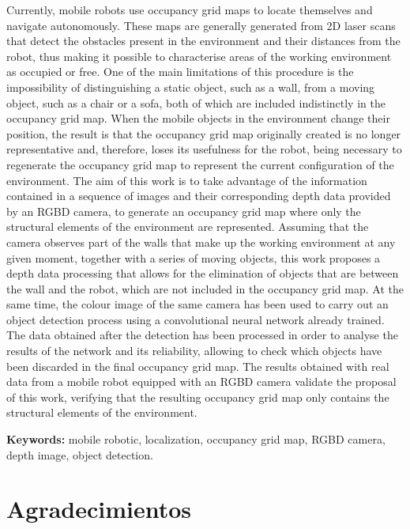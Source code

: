 Currently, mobile robots use occupancy grid maps to locate themselves and navigate autonomously. These maps are generally generated from 2D laser scans that detect the obstacles present in the environment and their distances from the robot, thus making it possible to characterise areas of the working environment as occupied or free. One of the main limitations of this procedure is the impossibility of distinguishing a static object, such as a wall, from a moving object, such as a chair or a sofa, both of which are included indistinctly in the occupancy grid map. When the mobile objects in the environment change their position, the result is that the occupancy grid map originally created is no longer representative and, therefore, loses its usefulness for the robot, being necessary to regenerate the occupancy grid map to represent the current configuration of the environment. The aim of this work is to take advantage of the information contained in a sequence of images and their corresponding depth data provided by an RGBD camera, to generate an occupancy grid map where only the structural elements of the environment are represented. Assuming that the camera observes part of the walls that make up the working environment at any given moment, together with a series of moving objects, this work proposes a depth data processing that allows for the elimination of objects that are between the wall and the robot, which are not included in the occupancy grid map. At the same time, the colour image of the same camera has been used to carry out an object detection process using a convolutional neural network already trained. The data obtained after the detection has been processed in order to analyse the results of the network and its reliability, allowing to check which objects have been discarded in the final occupancy grid map. The results obtained with real data from a mobile robot equipped with an RGBD camera validate the proposal of this work, verifying that the resulting occupancy grid map only contains the structural elements of the environment. 

\vspace{3cm}

\textbf{Keywords:} mobile robotic, localization, occupancy grid map, RGBD camera, depth image, object detection.

\chapter*{Agradecimientos}

